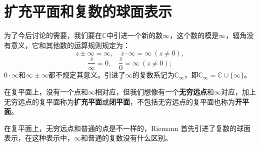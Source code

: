 \documentclass[../../main.tex]{subfiles}%
\begin{document}
\section{扩充平面和复数的球面表示}

\begin{definition}
为了今后讨论的需要，我们要在\(\mathbb{C}\)中引进一个新的数\(\infty\)，这个数的模是\(\infty\)，辐角没有意义，它和其他数的运算规则规定为：
\[
z \pm \infty = \infty, \quad z \cdot \infty = \infty \ (z \neq 0),
\]
\[
\frac{z}{\infty} = 0, \quad \frac{z}{0} = \infty \ (z \neq 0);
\]
\(0 \cdot \infty\)和\(\infty \pm \infty\)都不规定其意义。引进了\(\infty\)的复数系记为\(\mathbb{C}_\infty\)，即\(\mathbb{C}_\infty = \mathbb{C} \cup \{ \infty \}\)。

在复平面上，没有一个点和\(\infty\)相对应，但我们想像有一个\textbf{无穷远点}和\(\infty\)对应，加上无穷远点的复平面称为\textbf{扩充平面}或\textbf{闭平面}，不包括无穷远点的复平面也称为\textbf{开平面}。
\end{definition}
\begin{remark}
在复平面上，无穷远点和普通的点是不一样的，Riemann 首先引进了复数的球面表示，在这种表示中，\(\infty\)和普通的复数没有什么区别。
\end{remark}
\end{document}
